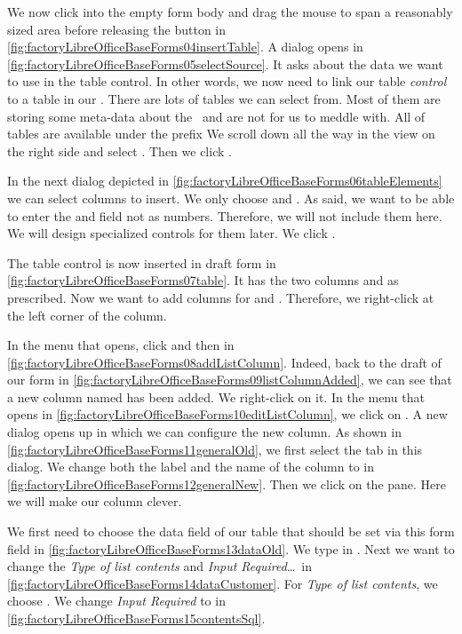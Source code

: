 We now click into the empty form body and drag the mouse to span a reasonably sized area before releasing the button in \cref{fig:factoryLibreOfficeBaseForms04insertTable}.
A dialog opens in \cref{fig:factoryLibreOfficeBaseForms05selectSource}.
It asks about the data we want to use in the table control.
In other words, we now need to link our table \emph{control} to a table in our \emph{\db}.
There are lots of tables we can select from.
Most of them are storing some meta-data about the \db\ and are not for us to meddle with.
All of  tables are available under the prefix 
We scroll down all the way in the view on the right side and select .
Then we click .

In the next dialog depicted in \cref{fig:factoryLibreOfficeBaseForms06tableElements} we can select columns to insert.
We only choose  and .
As said, we want to be able to enter the  and  field not as numbers.
Therefore, we will not include them here.
We will design specialized controls for them later.
We click .

The table control is now inserted in draft form in \cref{fig:factoryLibreOfficeBaseForms07table}.
It has the two columns  and  as prescribed.
Now we want to add columns for  and .
Therefore, we right-click at the left corner of the  column.

In the menu that opens, click  and then  in \cref{fig:factoryLibreOfficeBaseForms08addListColumn}.
Indeed, back to the draft of our form in \cref{fig:factoryLibreOfficeBaseForms09listColumnAdded}, we can see that a new column named  has been added.
We right-click on it.
In the menu that opens in \cref{fig:factoryLibreOfficeBaseForms10editListColumn}, we click on .
A new dialog opens up in which we can configure the new column.
As shown in \cref{fig:factoryLibreOfficeBaseForms11generalOld}, we first select the  tab in this dialog.
We change both the label and the name of the column to  in \cref{fig:factoryLibreOfficeBaseForms12generalNew}.
Then we click on the  pane.
Here we will make our column clever.

We first need to choose the data field of our  table that should be set via this form field in \cref{fig:factoryLibreOfficeBaseForms13dataOld}.
We type in .
Next we want to change the \emph{Type of list contents} and \emph{Input Required}\dots\ in \cref{fig:factoryLibreOfficeBaseForms14dataCustomer}.
For \emph{Type of list contents}, we choose .
We change \emph{Input Required} to  in \cref{fig:factoryLibreOfficeBaseForms15contentsSql}.

